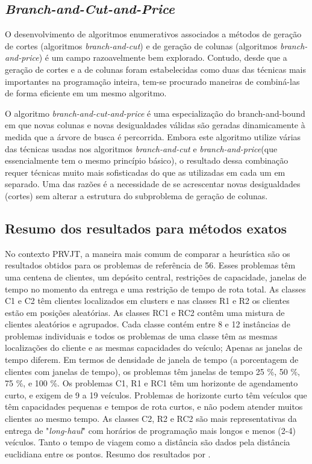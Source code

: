 \subsection{\textit{Branch-and-Cut-and-Price}}


O desenvolvimento de algoritmos enumerativos associados a métodos de geração de cortes (algoritmos \textit{branch-and-cut}) e de geração de colunas (algoritmos \textit{branch-and-price}) é um campo razoavelmente bem explorado. Contudo, desde que a geração de cortes e a de colunas foram estabelecidas como duas das técnicas mais importantes na programação inteira, tem-se procurado maneiras de combiná-las de forma eficiente em um mesmo algoritmo. 

O algoritmo \textit{branch-and-cut-and-price} é uma especialização do branch-and-bound em que novas colunas e novas desigualdades válidas são geradas dinamicamente à medida que a árvore de busca é percorrida. Embora este algoritmo utilize várias das técnicas usadas nos algoritmos \textit{branch-and-cut} e \textit{branch-and-price}(que essencialmente tem o mesmo princípio básico), o resultado dessa combinação requer técnicas muito mais sofisticadas do que as utilizadas em cada um em separado. Uma das razões é a necessidade de se acrescentar novas desigualdades (cortes) sem alterar a estrutura do subproblema de geração de colunas.


\subsection{Resumo dos resultados para métodos exatos} 
 
No contexto PRVJT, a maneira mais comum de comparar a heurística são os resultados obtidos para os problemas de referência de \cite{solomon87} 56. Esses problemas têm uma centena de clientes, um depósito central, restrições de capacidade, janelas de tempo no momento da entrega e uma restrição de tempo de rota total. As classes C1 e C2 têm clientes localizados em clusters e nas classes R1 e R2 os clientes estão em posições aleatórias. As classes RC1 e RC2 contêm uma mistura de clientes aleatórios e agrupados. Cada classe contém entre 8 e 12 instâncias de problemas individuais e todos os problemas de uma classe têm as mesmas localizações do cliente e as mesmas capacidades do veículo; Apenas as janelas de tempo diferem. Em termos de densidade de janela de tempo (a porcentagem de clientes com janelas de tempo), os problemas têm janelas de tempo 25 \%, 50 \%, 75 \%, e 100 \%. Os problemas C1, R1 e RC1 têm um horizonte de agendamento curto, e exigem de 9 a 19 veículos. Problemas de horizonte curto têm veículos que têm capacidades pequenas e tempos de rota curtos, e não podem atender muitos clientes ao mesmo tempo. As classes C2, R2 e RC2 são mais representativas da entrega de "\textit{long-haul}" com horários de programação mais longos e menos (2-4) veículos. Tanto o tempo de viagem como a distância são dados pela distância euclidiana entre os pontos.  Resumo dos resultados por \cite{vigo14}.

